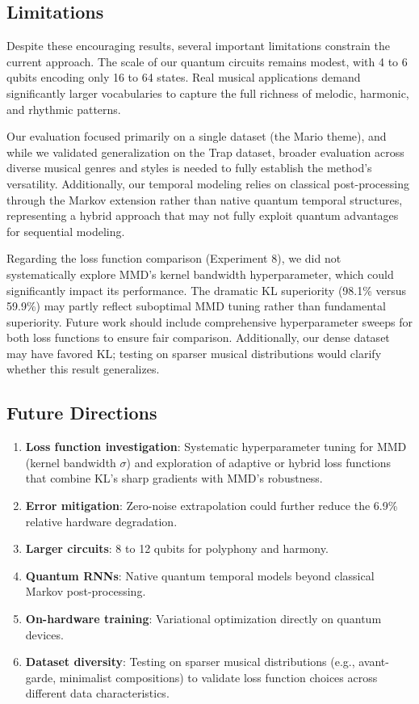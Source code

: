 \documentclass[11pt,a4paper]{article}
\begin{document}
\subsection{Limitations}

Despite these encouraging results, several important limitations constrain the current approach. The scale of our quantum circuits remains modest, with 4 to 6 qubits encoding only 16 to 64 states. Real musical applications demand significantly larger vocabularies to capture the full richness of melodic, harmonic, and rhythmic patterns. 

Our evaluation focused primarily on a single dataset (the Mario theme), and while we validated generalization on the Trap dataset, broader evaluation across diverse musical genres and styles is needed to fully establish the method's versatility. Additionally, our temporal modeling relies on classical post-processing through the Markov extension rather than native quantum temporal structures, representing a hybrid approach that may not fully exploit quantum advantages for sequential modeling.

Regarding the loss function comparison (Experiment 8), we did not systematically explore MMD's kernel bandwidth hyperparameter, which could significantly impact its performance. The dramatic KL superiority (98.1\% versus 59.9\%) may partly reflect suboptimal MMD tuning rather than fundamental superiority. Future work should include comprehensive hyperparameter sweeps for both loss functions to ensure fair comparison. Additionally, our dense dataset may have favored KL; testing on sparser musical distributions would clarify whether this result generalizes.

\subsection{Future Directions}

\begin{enumerate}
    \item \textbf{Loss function investigation}: Systematic hyperparameter tuning for MMD (kernel bandwidth $\sigma$) and exploration of adaptive or hybrid loss functions that combine KL's sharp gradients with MMD's robustness.
    \item \textbf{Error mitigation}: Zero-noise extrapolation could further reduce the 6.9\% relative hardware degradation.
    \item \textbf{Larger circuits}: 8 to 12 qubits for polyphony and harmony.
    \item \textbf{Quantum RNNs}: Native quantum temporal models beyond classical Markov post-processing.
    \item \textbf{On-hardware training}: Variational optimization directly on quantum devices.
    \item \textbf{Dataset diversity}: Testing on sparser musical distributions (e.g., avant-garde, minimalist compositions) to validate loss function choices across different data characteristics.
\end{enumerate}
\end{document}
